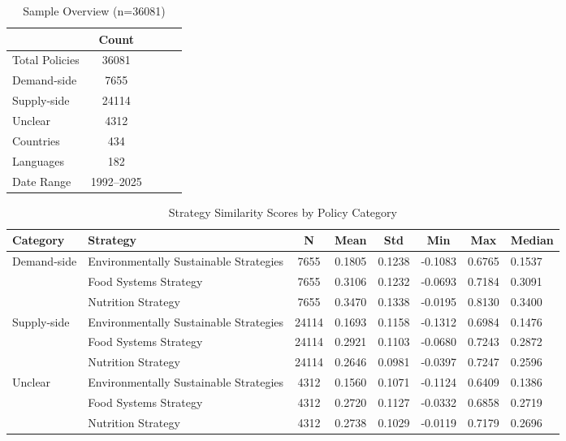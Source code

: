 
\begin{table}[htbp]
\centering
\caption{Sample Overview (n=36081)}
\label{tab:sample_overview}
\begin{tabular}{lcccc}
\toprule
 & Count & \\
\midrule
Total Policies & 36081 & \\
\quad Demand-side & 7655 & \\
\quad Supply-side & 24114 & \\
\quad Unclear & 4312 & \\
\midrule
Countries & 434 & \\
Languages & 182 & \\
Date Range & 1992--2025 & \\
\bottomrule
\end{tabular}
\end{table}


\begin{table}[htbp]
\centering
\caption{Strategy Similarity Scores by Policy Category}
\label{tab:strategy_stats_by_category}
\begin{tabular}{l l c c c c c}
\toprule
Category & Strategy & N & Mean & Std & Min & Max & Median \\
\midrule
Demand-side & Environmentally Sustainable Strategies & 7655 & 0.1805 & 0.1238 & -0.1083 & 0.6765 & 0.1537 \\
 & Food Systems Strategy & 7655 & 0.3106 & 0.1232 & -0.0693 & 0.7184 & 0.3091 \\
 & Nutrition Strategy & 7655 & 0.3470 & 0.1338 & -0.0195 & 0.8130 & 0.3400 \\
Supply-side & Environmentally Sustainable Strategies & 24114 & 0.1693 & 0.1158 & -0.1312 & 0.6984 & 0.1476 \\
 & Food Systems Strategy & 24114 & 0.2921 & 0.1103 & -0.0680 & 0.7243 & 0.2872 \\
 & Nutrition Strategy & 24114 & 0.2646 & 0.0981 & -0.0397 & 0.7247 & 0.2596 \\
Unclear & Environmentally Sustainable Strategies & 4312 & 0.1560 & 0.1071 & -0.1124 & 0.6409 & 0.1386 \\
 & Food Systems Strategy & 4312 & 0.2720 & 0.1127 & -0.0332 & 0.6858 & 0.2719 \\
 & Nutrition Strategy & 4312 & 0.2738 & 0.1029 & -0.0119 & 0.7179 & 0.2696 \\
\bottomrule
\end{tabular}
\end{table}


